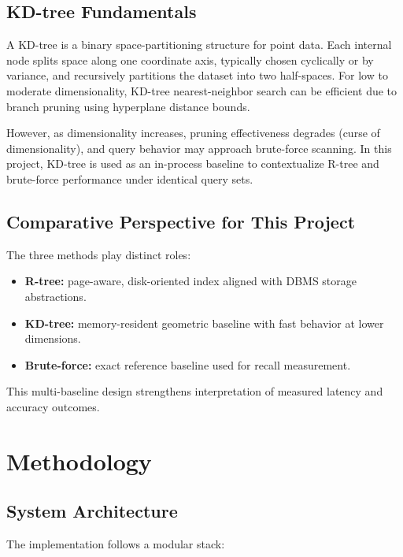 \documentclass[11pt,a4paper]{article}
\begin{document}
\subsection{KD-tree Fundamentals}

A KD-tree is a binary space-partitioning structure for point data. Each internal node splits space along one coordinate axis, typically chosen cyclically or by variance, and recursively partitions the dataset into two half-spaces. For low to moderate dimensionality, KD-tree nearest-neighbor search can be efficient due to branch pruning using hyperplane distance bounds.

However, as dimensionality increases, pruning effectiveness degrades (curse of dimensionality), and query behavior may approach brute-force scanning. In this project, KD-tree is used as an in-process baseline to contextualize R-tree and brute-force performance under identical query sets.

\subsection{Comparative Perspective for This Project}

The three methods play distinct roles:

\begin{itemize}[leftmargin=1.5em]
  \item \textbf{R-tree:} page-aware, disk-oriented index aligned with DBMS storage abstractions.
  \item \textbf{KD-tree:} memory-resident geometric baseline with fast behavior at lower dimensions.
  \item \textbf{Brute-force:} exact reference baseline used for recall measurement.
\end{itemize}

This multi-baseline design strengthens interpretation of measured latency and accuracy outcomes.

\section{Methodology}

\subsection{System Architecture}

The implementation follows a modular stack:
\end{document}
